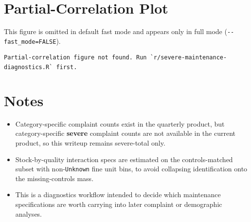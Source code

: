 \documentclass[
  11pt,
]{article}
\providecommand{\tightlist}{%
  \setlength{\itemsep}{0pt}\setlength{\parskip}{0pt}}
\begin{document}
\section{Partial-Correlation Plot}\label{partial-correlation-plot}

This figure is omitted in default fast mode and appears only in full
mode (\texttt{-\/-fast\_mode=FALSE}).

\begin{verbatim}
Partial-correlation figure not found. Run `r/severe-maintenance-diagnostics.R` first.
\end{verbatim}

\section{Notes}\label{notes}

\begin{itemize}
\tightlist
\item
  Category-specific complaint counts exist in the quarterly product, but
  category-specific \textbf{severe} complaint counts are not available
  in the current product, so this writeup remains severe-total only.
\item
  Stock-by-quality interaction specs are estimated on the
  controls-matched subset with non-\texttt{Unknown} fine unit bins, to
  avoid collapsing identification onto the missing-controls mass.
\item
  This is a diagnostics workflow intended to decide which maintenance
  specifications are worth carrying into later complaint or demographic
  analyses.
\end{itemize}
\end{document}

